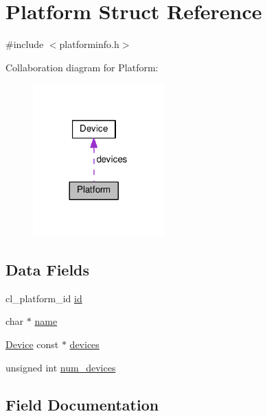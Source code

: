 \hypertarget{structPlatform}{}\section{Platform Struct Reference}
\label{structPlatform}


{\ttfamily \#include $<$platforminfo.\+h$>$}



Collaboration diagram for Platform\+:\nopagebreak
\begin{figure}[H]
\begin{center}
\leavevmode
\includegraphics[width=144pt]{structPlatform__coll__graph}
\end{center}
\end{figure}
\subsection*{Data Fields}
\begin{DoxyCompactItemize}
\item 
cl\+\_\+platform\+\_\+id \hyperlink{structPlatform_a4d149e964a154be9bf66784aa1638d87}{id}
\item 
char $\ast$ \hyperlink{structPlatform_a1a3dfb57b0d06ee67684349e1b46631e}{name}
\item 
\hyperlink{structDevice}{Device} const $\ast$ \hyperlink{structPlatform_acdbc822eea50422804f6f8e6de359c0a}{devices}
\item 
unsigned int \hyperlink{structPlatform_a0215aa9a2a4ce8f0ed19ad88a2b6f372}{num\+\_\+devices}
\end{DoxyCompactItemize}


\subsection{Field Documentation}
\hypertarget{structPlatform_acdbc822eea50422804f6f8e6de359c0a}{}
